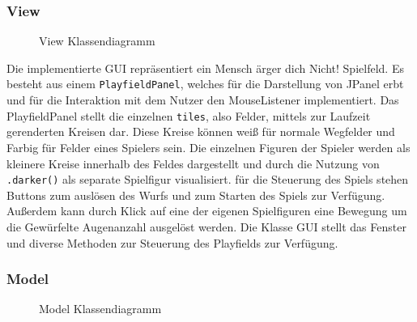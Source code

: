 \documentclass[conference]{IEEEtran}
\begin{document}
\subsubsection{View}
\begin{figure}[]
    \centering
    \caption{View Klassendiagramm}
\end{figure}

Die implementierte GUI repr\"asentiert ein Mensch \"arger dich Nicht! Spielfeld. Es besteht aus einem \texttt{PlayfieldPanel}, welches f\"ur die Darstellung von JPanel erbt und f\"ur die Interaktion mit dem Nutzer den MouseListener implementiert. Das PlayfieldPanel stellt die einzelnen \texttt{tiles}, also Felder, mittels zur Laufzeit gerenderten Kreisen dar. Diese Kreise k\"onnen wei{\ss}   f\"ur normale Wegfelder und Farbig f\"ur Felder eines Spielers sein. 
  Die einzelnen Figuren der Spieler werden als kleinere Kreise innerhalb des Feldes dargestellt und durch die Nutzung von \texttt{.darker()} als separate Spielfigur visualisiert. f\"ur die Steuerung des Spiels stehen Buttons zum ausl\"osen des Wurfs und zum Starten des Spiels zur Verfügung. Außerdem kann durch Klick auf eine der eigenen Spielfiguren eine Bewegung um die Gewürfelte Augenanzahl ausgelöst werden. 
  Die Klasse GUI stellt das Fenster und diverse Methoden zur Steuerung des Playfields zur Verf\"ugung. 

\subsubsection{Model}


\begin{figure}[]
    \centering
    \caption{Model Klassendiagramm}
\end{figure}
\end{document}
